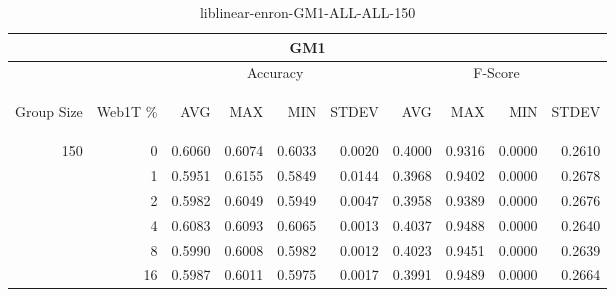 \begin{center}
\begin{table}[htbp]
\begin{tabular}{ | r | r | r | r | r | r | r | r | r | r |}
\hline
\multicolumn{10}{|c|}{GM1}\\
\hline
 & & \multicolumn{4}{|c|}{Accuracy} & \multicolumn{4}{|c|}{F-Score}\\ \cline{3-10}
\begin{sideways}Group Size\end{sideways} & \begin{sideways}Web1T \%\end{sideways} & \begin{sideways}AVG\end{sideways} & \begin{sideways}MAX\end{sideways} & \begin{sideways}MIN\end{sideways} & \begin{sideways}STDEV\end{sideways} & \begin{sideways}AVG\end{sideways} & \begin{sideways}MAX\end{sideways} & \begin{sideways}MIN\end{sideways} & \begin{sideways}STDEV\end{sideways}\\
\hline
\multirow{5}{*}{150}
 & 0 & 0.6060 & 0.6074 & 0.6033 & 0.0020 & 0.4000 & 0.9316 & 0.0000 & 0.2610\\ \cline{2-10}
 & 1 & 0.5951 & 0.6155 & 0.5849 & 0.0144 & 0.3968 & 0.9402 & 0.0000 & 0.2678\\ \cline{2-10}
 & 2 & 0.5982 & 0.6049 & 0.5949 & 0.0047 & 0.3958 & 0.9389 & 0.0000 & 0.2676\\ \cline{2-10}
 & 4 & 0.6083 & 0.6093 & 0.6065 & 0.0013 & 0.4037 & 0.9488 & 0.0000 & 0.2640\\ \cline{2-10}
 & 8 & 0.5990 & 0.6008 & 0.5982 & 0.0012 & 0.4023 & 0.9451 & 0.0000 & 0.2639\\ \cline{2-10}
 & 16 & 0.5987 & 0.6011 & 0.5975 & 0.0017 & 0.3991 & 0.9489 & 0.0000 & 0.2664\\ \cline{2-10}
\hline
\end{tabular}
\caption{liblinear-enron-GM1-ALL-ALL-150}
\label{table:liblinear-enron-GM1-ALL-ALL-150}
\end{table}
\end{center}

